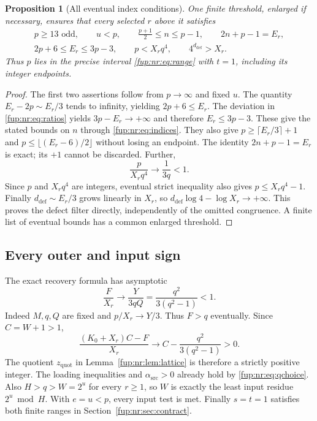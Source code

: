 \documentclass[11pt,letterpaper]{article}
\newtheorem{proposition}[theorem]{Proposition}
\theoremstyle{definition}\newtheorem{definition}[theorem]{Definition}
\theoremstyle{remark}\newtheorem{remark}[theorem]{Remark}
\newcommand{\zquot}{z_{\mathrm{quot}}}\newcommand{\ga}{g_a}
\begin{document}
\begin{proposition}[All eventual index conditions]\label{fup:nr:prop:bounds}
One finite threshold, enlarged if necessary, ensures that every selected $r$ above it satisfies
\begin{equation}\label{fup:nr:eq:allbounds}
 \begin{gathered}
 p\ge13\text{ odd},\qquad u<p,\qquad
 \frac{p+1}2\le n\le p-1,\qquad 2n+p-1=E_r,\\
 2p+6\le E_r\le3p-3,\qquad p<X_rq^4,
 \qquad 4^{d_{\mathrm{def}}}>X_r.
 \end{gathered}
\end{equation}
Thus $p$ lies in the precise interval \eqref{fup:nr:eq:range} with $t=1$, including its integer endpoints.
\end{proposition}
\begin{proof}
The first two assertions follow from $p\to\infty$ and fixed $u$. The quantity $E_r-2p\sim E_r/3$ tends to infinity, yielding $2p+6\le E_r$. The deviation in \eqref{fup:nr:eq:ratios} yields $3p-E_r\to+\infty$ and therefore $E_r\le3p-3$. These give the stated bounds on $n$ through \eqref{fup:nr:eq:indices}. They also give $p\ge\lceil E_r/3\rceil+1$ and $p\le\lfloor(E_r-6)/2\rfloor$ without losing an endpoint. The identity $2n+p-1=E_r$ is exact; its $+1$ cannot be discarded. Further,
\[
 \frac p{X_rq^4}\longrightarrow\frac1{3q}<1.
\]
Since $p$ and $X_rq^4$ are integers, eventual strict inequality also gives $p\le X_rq^4-1$. Finally $d_{\mathrm{def}}\sim E_r/3$ grows linearly in $X_r$, so $d_{\mathrm{def}}\log4-\log X_r\to+\infty$. This proves the defect filter directly, independently of the omitted congruence. A finite list of eventual bounds has a common enlarged threshold.
\end{proof}

\subsection{Every outer and input sign}
The exact recovery formula has asymptotic
\begin{equation}\label{fup:nr:eq:Fasymp}
 \frac F{X_r}\longrightarrow\frac{Y}{3qQ}
 =\frac{q^2}{3(q^2-1)}<1.
\end{equation}
Indeed $M,q,Q$ are fixed and $p/X_r\to Y/3$. Thus $F>q$ eventually. Since $C=W+1>1$,
\[
 \frac{(K_0+X_r)C-F}{X_r}
 \longrightarrow C-\frac{q^2}{3(q^2-1)}>0.
\]
The quotient $\zquot$ in Lemma~\ref{fup:nr:lem:lattice} is therefore a strictly positive integer. The loading inequalities and $\alpha_{\mathrm{src}}>0$ already hold by \eqref{fup:nr:eq:qchoice}. Also $H>q>W=2^u$ for every $r\ge1$, so $W$ is exactly the least input residue $2^u\bmod H$. With $e=u<p$, every input test is met. Finally $s=t=1$ satisfies both finite ranges in Section~\ref{fup:nr:sec:contract}.
\end{document}
